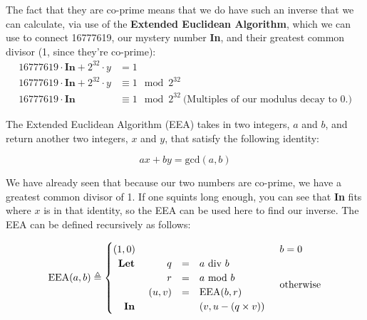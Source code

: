 \documentclass[14pt,a4paper,notitlepage]{extarticle}
\begin{document}
                The fact that they are co-prime means that we do have such an inverse
                that we can calculate, via use of the \textbf{Extended Euclidean Algorithm},
                which we can use to connect 16777619, our mystery number \textbf{In}, and
                their greatest common divisor (1, since they're co-prime):
                \begin{align*}
                    16777619 \cdot \mathbf{In} + 2^{32} \cdot y &= 1\\
                    16777619 \cdot \mathbf{In} + 2^{32} \cdot y &\equiv 1 \mod 2^{32}\\
                    16777619 \cdot \mathbf{In} &\equiv 1 \mod 2^{32}\ \text{(Multiples of our modulus decay to 0.)}
                \end{align*}

                The Extended Euclidean Algorithm (EEA) takes in two integers, $a$ and $b$, and return
                another two integers, $x$ and $y$, that satisfy the following identity:

                \begin{equation*}
                    ax + by = \text{gcd}(a, b)
                \end{equation*}

                We have already seen that because our two numbers are co-prime, we have a
                greatest common divisor of 1. If one squints long enough, you can see that
                \textbf{In} fits where $x$ is in that identity, so the EEA can be used here to
                find our inverse. The EEA can be defined recursively as follows:

                \begin{equation*}
                    \text{EEA}(a, b) \triangleq \begin{cases}
                        (1, 0) & b = 0\\
                        \begin{array}{rrcl}
                            \text{\textbf{Let }} & q & = & a\ \text{div}\ b \\
                            & r & = & a\ \text{mod}\ b \\
                            & (u, v) & = & \text{EEA}(b, r) \\
                            \text{\textbf{In }} & & & (v, u - (q \times v))
                        \end{array} & \text{otherwise}
                    \end{cases}
                \end{equation*}
\end{document}
